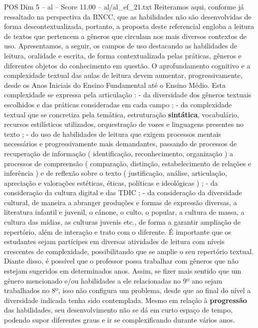 \begin{textsample}{POS Dim 5 – al – Score 11.00 – al/al\_ef\_21.txt}  \label{ex:f5_pos_042}
Reiteramos aqui, conforme já ressaltado na perspectiva da BNCC, que as habilidades não são desenvolvidas de forma descontextualizada, portanto, a proposta deste referencial engloba a leitura de textos que pertencem a gêneros que circulam nos mais diversos contextos de uso.
Apresentamos, a seguir, os campos de uso destacando as habilidades de leitura, oralidade e escrita, de forma contextualizada pelas práticas, gêneros e diferentes objetos do conhecimento em questão.
O aprofundamento cognitivo e a complexidade textual das aulas de leitura devem aumentar, progressivamente, desde os Anos Iniciais do Ensino Fundamental até o Ensino Médio.
Esta complexidade se expressa pela articulação : - da diversidade dos gêneros textuais escolhidos e das práticas consideradas em cada campo ; - da complexidade textual que se concretiza pela temática, estruturação \textbf{sintática}, vocabulário, recursos estilísticos utilizados, orquestração de vozes e linguagens presentes no texto ; - do uso de habilidades de leitura que exigem processos mentais necessários e progressivamente mais demandantes, passando de processos de recuperação de informação ( identificação, reconhecimento, organização ) a processos de compreensão ( comparação, distinção, estabelecimento de relações e inferência ) e de reflexão sobre o texto ( justificação, análise, articulação, apreciação e valorações estéticas, éticas, políticas e ideológicas ) ; - da consideração da cultura digital e das TDIC ; - da consideração da diversidade cultural, de maneira a abranger produções e formas de expressão diversas, a literatura infantil e juvenil, o cânone, o culto, o popular, a cultura de massa, a cultura das mídias, as culturas juvenis etc., de forma a garantir ampliação de repertório, além de interação e trato com o diferente.
É importante que os estudantes sejam partícipes em diversas atividades de leitura com níveis crescentes de complexidade, possibilitando que se amplie o seu repertório textual.
Diante disso, é possível que o professor possa trabalhar com gêneros que não estejam sugeridos em determinados anos.
Assim, se fizer mais sentido que um gênero mencionado e/ou habilidades a ele relacionadas no 9º ano sejam trabalhados no 8º, isso não configura um problema, desde que ao final do nível a diversidade indicada tenha sido contemplada.
Mesmo em relação à \textbf{progressão} das habilidades, seu desenvolvimento não se dá em curto espaço de tempo, podendo supor diferentes graus e ir se complexificando durante vários anos.

\end{textsample}

